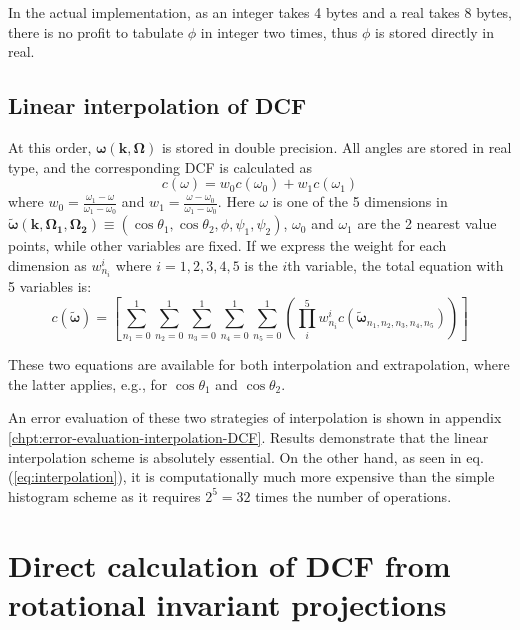 In the actual implementation, as an integer takes 4 bytes and a real
takes 8 bytes, there is no profit to tabulate $\phi$ in integer two
times, thus $\phi$ is stored directly in real.

\subsection{Linear interpolation of DCF\label{subsec:Linear-interpolation-of}}

At this order, $\boldsymbol{\omega}(\mathbf{k},\mathbf{\Omega})$
is stored in double precision. All angles are stored in real type,
and the corresponding DCF is calculated as
\begin{equation}
c(\omega)=w_{0}c(\omega_{0})+w_{1}c(\omega_{1})
\end{equation}
where $w_{0}=\frac{\omega_{1}-\omega}{\omega_{1}-\omega_{0}}$ and
$w_{1}=\frac{\omega-\omega_{0}}{\omega_{1}-\omega_{0}}$. Here $\omega$
is one of the 5 dimensions in $\tilde{\boldsymbol{\omega}}(\mathbf{k},\mathbf{\Omega_{1}},\mathbf{\Omega_{2}})\equiv(\cos\theta_{1},\cos\theta_{2},\phi,\psi_{1},\psi_{2})$,
$\omega_{0}$ and $\omega_{1}$ are the 2 nearest value points, while
other variables are fixed. If we express the weight for each dimension
as $w_{n_{i}}^{i}$ where $i=1,2,3,4,5$ is the $i$th variable, the
total equation with 5 variables is:
\begin{equation}
c(\tilde{\boldsymbol{\omega}})=\left[\sum_{n_{1}=0}^{1}\sum_{n_{2}=0}^{1}\sum_{n_{3}=0}^{1}\sum_{n_{4}=0}^{1}\sum_{n_{5}=0}^{1}\left(\prod_{i}^{5}w_{n_{i}}^{i}c(\tilde{\boldsymbol{\omega}}_{n_{1},n_{2},n_{3},n_{4},n_{5}})\right)\right]\label{eq:interpolation}
\end{equation}

These two equations are available for both interpolation and extrapolation,
where the latter applies, e.g., for $\cos\theta_{1}$ and $\cos\theta_{2}$. 

An error evaluation of these two strategies of interpolation is shown
in appendix \ref{chpt:error-evaluation-interpolation-DCF}. Results
demonstrate that the linear interpolation scheme is absolutely essential.
On the other hand, as seen in eq. (\ref{eq:interpolation}), it is
computationally much more expensive than the simple histogram scheme
as it requires $2^{5}=32$ times the number of operations.

\section{Direct calculation of DCF from rotational invariant projections}

